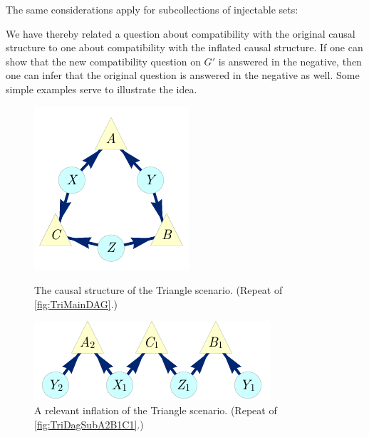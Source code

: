 The same considerations apply for subcollections of injectable sets:


We have thereby related a question about compatibility with the original causal structure to one about compatibility with the inflated causal structure.  If one can show that the new compatibility question on $G'$ is answered in the negative, then one can infer that the original question is answered in the negative as well.    Some simple examples serve to illustrate the idea.





\par\smallskip\nobreak

\begin{figure}[bh]
\centering
\begin{minipage}[t]{0.45\linewidth}
\centering
\includegraphics[scale=1]{TriDagRawALT.pdf}
\caption{The causal structure of the Triangle scenario. (Repeat of \cref{fig:TriMainDAG}.)}\label{fig:TriMainDAGv2}
\end{minipage}
\hfill
\begin{minipage}[t]{0.45\linewidth}
\centering
\includegraphics[scale=1]{TriDagSubA2B1C1.pdf}
\caption{A relevant inflation of the Triangle scenario. (Repeat of \cref{fig:TriDagSubA2B1C1}.)}\label{fig:TriDagSubA2B1C1v2}
\end{minipage}
\end{figure}


